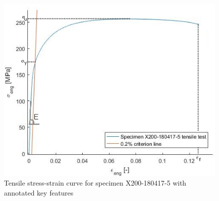  \begin{figure}[ht]
\centering
\centerline{\includegraphics[scale=0.7]{Images/Tract}}
\decoRule
\caption[Tensile stress-strain curve for specimen X200-180417-5 with annotated key features]{Tensile stress-strain curve for specimen X200-180417-5 with annotated key features}
\label{fig:Tract}
\end{figure}


